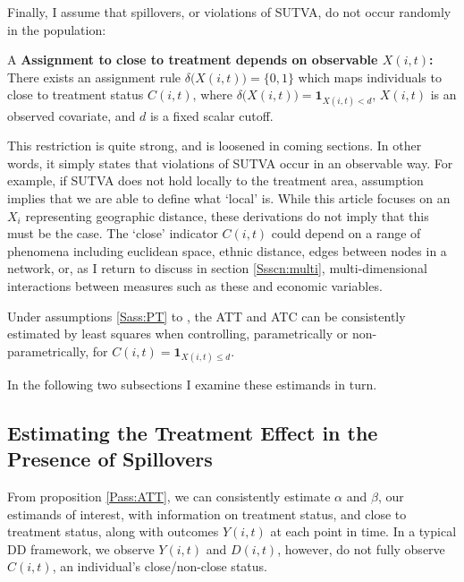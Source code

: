 Finally, I assume that spillovers, or violations of SUTVA, do not occur randomly
in the population:
\begin{assumption}{4}{A}
\label{Sass:SUTVAl}
\textbf{Assignment to close to treatment depends on observable $X(i,t)$:} \\ 
There exists an assignment rule $\delta\Big(X(i,t)\Big)=\{0,1\}$ which maps 
individuals to close to treatment status $C(i,t)$, where $\delta\Big(X(i,t)\Big)=
\mathbf{1}_{X(i,t)<d}$, $X(i,t)$ is an observed covariate, and $d$ is a fixed
scalar cutoff. 
\end{assumption}
\vspace{-4mm}
\noindent This restriction is quite strong, and is loosened in coming sections.  
In other words, it simply states 
that violations of SUTVA occur in an observable way.  For example, if SUTVA does
not hold locally to the treatment area, assumption  implies
that we are able to define what `local' is.  While this article focuses on
an $X_i$ representing geographic distance, these derivations do not imply that 
this must be the case.  The `close' indicator $C(i,t)$ could depend on a range 
of phenomena including euclidean space, ethnic distance, edges between
nodes in a network, or, as I return to discuss in section \ref{Ssscn:multi}, 
multi-dimensional interactions between measures such as these and economic 
variables. 
\begin{proposition}
\label{Pass:ATT}
Under assumptions \ref{Sass:PT} to , the ATT and ATC can be 
consistently estimated by least squares when controlling, parametrically or
non-parametrically, for $C(i,t)=\mathbf{1}_{X(i,t)\leq d}$.
\end{proposition}
\noindent In the following two subsections I examine these estimands in turn. 

\subsection{Estimating the Treatment Effect in the Presence of Spillovers}
\label{Ssscn:TE}
From proposition \ref{Pass:ATT}, we can consistently estimate $\alpha$ and 
$\beta$, our estimands of interest, with information on treatment status, and 
close to treatment status, along with outcomes $Y(i,t)$ at each point in time. In 
a typical DD framework, we observe $Y(i,t)$ and $D(i,t)$, however, do not fully 
observe $C(i,t)$, an individual's close/non-close status.

